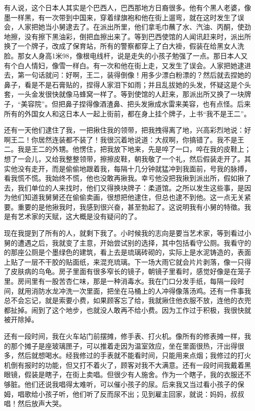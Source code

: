 有人说，这个日本人其实是个巴西人，巴西那地方日裔很多。他有个黑人老婆，像墨一样黑，有一次带到中国来，穿着绿旗袍和他在街上遛弯，就在这时发生了误会，人家把她当小舅逮去了。在派出所里，他们拿毛巾蘸了水、汽油、丙酮，使劲地擦，没有擦下黑油彩，倒把血擦出来了。等到巴西使馆的人闻讯赶来时，派出所换了一个牌子，改成了保育站，所有的警察都穿上了白大褂，假装在给黑女人洗脸。那女人身高1米98，像根电线杆，说是走失的小孩子勉强了一点。那日本人又有个白人情妇，像雪一样白。有一次和他在街上走，又发生了误会。人家把她逮进去，第一句话就问：好啊，王二，装得倒像！用多少漂白粉漂的？然后就去捏她的鼻子，看是不是石膏贴的，捏得人家泪下如雨；并且乱拔她的头发，怀疑这是个头套，一头金发很快就像马蜂窝一样了。等到使馆的人赶来，那派出所又换了一块牌子，“美容院”。但把鼻子捏得像酒渣鼻、把头发揪成水雷来美容，也有点怪。后来所有的外国女人和这日本人一起上街前，都在身上挂个牌子，上书“我不是王二”。 

还有一天他们逮住了我，一把揪住我的领带，把我拽得离了地，兴高彩烈地说：好啊王二！你居然连装都不装了！我很沉着地说道：大叔啊，你搞错了。我不是王二。我是王二的外甥。他愣住，把我放下地来，先是啐了一口，啐在我的皮鞋上；想了一会儿，又给我整整领带，擦擦皮鞋，朝我敬了一个礼，然后假装走开了。其实他没有走开，而是偷偷地跟着我，每隔十几分钟就猛冲到我面前，号我的脉搏，看我慌不慌。我始终不慌，他也没敢再揪我。幸亏他没把我揪到派出所，假如揪了去，我们单位的人来找时，他们又得换块牌子：柔道馆。之所以发生这些事，是因为他们知道我舅舅还在偷偷卖画，很想把他逮住，但总也逮不到他。这一点无关紧要。重要的是他揪我时，我感到很兴奋，甚至勃起了。这说明我有小舅的特徵。我是有艺术家的天赋，这大概是没有疑问的了。 

现在我提到了所有的人，就剩下我了。小时候我的志向是要当艺术家，等到看过小舅的遭遇之后，我就变了主意，开始尝试别的选择，其中包括看守公厕。我看守的的那座公厕是个墨绿色的建筑，看上去是琉璃砖砌的，实际上是水泥铸造的，表面上贴了一层不干胶的贴面纸，来混充琉璃。下一场大雨它就会片片剥落，像一只得了皮肤病的乌龟。房子里面有很多窄长的镜子，朝镜子里看时，感觉好像是在笼子里。房间里有一股苦杏仁味，那是一种消毒水。我在门口分发手纸，每隔一段时间，就用消防水龙冲洗一次里面，把坐在马桶上的人冲得像落汤鸡。还有一件事我总不会忘记，就是索要小费，如果顾客忘了给，我就揪住他衣服不放，连他的衣兜都扯掉。闹到了这个地步，也就没人敢再不给小费。因为工作过于积极，我很快就被开除掉。 

还有一段时间，我在火车站门前摆摊，修手表、打火机。像所有的修表摊一样，我的那个摊子是座玻璃匣子，可以推着走因为温室效应，坐在里面很热，汗出得很多，然后就想喝水。经我修过的手表就不能看时间，只能用来点烟；我修过的打火机倒有报时的功能，但又打不着火了，顾客对我不大满意。还有一段时间我戴着黑眼镜，假装是瞎子，在街上卖唱。但很少有人施舍。作为一个瞎子，我的衣服还不够脏。他们还说我唱得太难听，可以催小孩子的尿。后来我又当过看小孩子的保姆，唱歌给小孩子听，他们听了反而尿不出；见到雇主回家，就说：妈妈，叔叔唱！然后放声大哭。 

